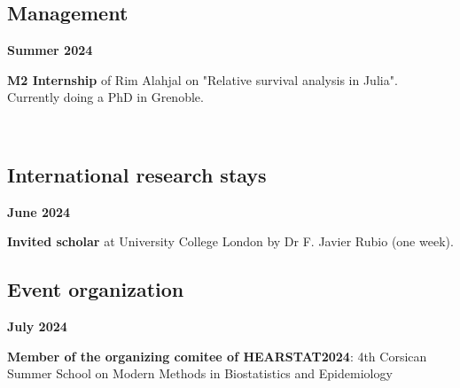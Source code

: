 \documentclass[a4paper,11pt]{article}
\newcommand{\tabcv}[2]{
\begin{minipage}[t]{0.12\linewidth}
\textbf{\footnotesize #1}
\end{minipage}\hfill
\begin{minipage}[t]{0.85\linewidth}
#2
\end{minipage}
\vspace{1em}
}
\begin{document}
\subsection{Management}
\tabcv{Summer 2024}{\textbf{M2 Internship} of Rim Alahjal on "Relative survival analysis in Julia". Currently doing a PhD in Grenoble.} \\[0.5em]

\subsection{International research stays}
\tabcv{June 2024}{\textbf{Invited scholar} at University College London by Dr F. Javier Rubio (one week). \\[0.5em]
}

\subsection{Event organization}

\tabcv{July 2024}{\textbf{Member of the organizing comitee of HEARSTAT2024}: 4th Corsican Summer School on Modern Methods in Biostatistics and Epidemiology} \\[0.5em]
\end{document}
